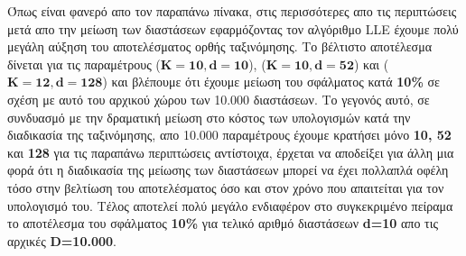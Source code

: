 \par
Όπως είναι φανερό απο τον παραπάνω πίνακα, στις περισσότερες απο τις περιπτώσεις μετά απο την μείωση των διαστάσεων εφαρμόζοντας τον αλγόριθμο \textlatin{LLE} έχουμε πολύ μεγάλη αύξηση του αποτελέσματος ορθής ταξινόμησης. Το βέλτιστο αποτέλεσμα δίνεται για τις παραμέτρους ($\mathbf{K=10, d=10}$), ($\mathbf{K=10,d=52}$) και ($\mathbf{K=12,d=128}$) και βλέπουμε ότι έχουμε μείωση του σφάλματος κατά \textbf{10\%} σε σχέση με αυτό του αρχικού χώρου των 10.000 διαστάσεων. Το γεγονός αυτό, σε συνδυασμό με την δραματική μείωση στο κόστος των υπολογισμών κατά την διαδικασία της ταξινόμησης, απο 10.000 παραμέτρους έχουμε κρατήσει μόνο \textbf{10, 52} και \textbf{128} για τις παραπάνω περιπτώσεις αντίστοιχα, έρχεται να αποδείξει για άλλη μια φορά ότι η διαδικασία της μείωσης των διαστάσεων μπορεί να έχει πολλαπλά οφέλη τόσο στην βελτίωση του αποτελέσματος όσο και στον χρόνο που απαιτείται για τον υπολογισμό του. Τέλος αποτελεί πολύ μεγάλο ενδιαφέρον στο συγκεκριμένο πείραμα το αποτέλεσμα του σφάλματος \textbf{10\%} για τελικό αριθμό διαστάσεων \textbf{\textlatin{d}=10} απο τις αρχικές \textbf{\textlatin{D}=10.000}.